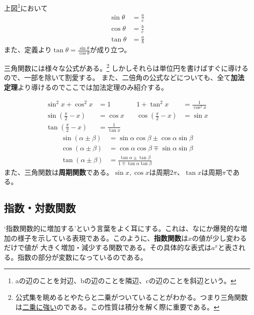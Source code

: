 \documentclass[a4j,dvipdfmx]{jsarticle}
\begin{document}
                上図\footnote{aの辺のことを対辺、bの辺のことを隣辺、cの辺のことを斜辺という。}において
                \begin{align}
                    \sin \theta &= \frac{a}{c}\\
                    \cos \theta &= \frac{b}{c}\\
                    \tan \theta &= \frac{a}{b}
                \end{align}
                また、定義より$\displaystyle\tan \theta = \frac{\sin \theta}{\cos \theta}$が成り立つ。

                三角関数には様々な公式がある。\footnote{公式集を眺めるとやたらと二乗がついていることがわかる。つまり三角関数は\underline{二乗に強い}のである。この性質は積分を解く際に重要である。}
                しかしそれらは単位円を書けばすぐに導けるので、一部を除いて割愛する。
                また、二倍角の公式などについても、全て\textbf{加法定理}より導けるのでここでは加法定理のみ紹介する。

                \begin{align}
                    \sin^2 x + \cos ^2 x &= 1 &\quad 1 + \tan^2 x &= \frac{1}{\cos^2 x}\\
                    \sin\left(\frac{\pi}{2}-x\right) &= \cos x &\quad \cos\left(\frac{\pi}{2}-x\right) &= \sin x\\
                    \tan\left(\frac{\pi}{2}-x\right) &= \frac{1}{\tan x} &&
                \end{align}
                \begin{align}
                    \sin(\alpha\pm\beta) &= \sin\alpha\cos\beta \pm \cos\alpha\sin\beta\\
                    \cos(\alpha\pm\beta) &= \cos\alpha\cos\beta \mp \sin\alpha\sin\beta\\
                    \tan(\alpha\pm\beta) &= \frac{\tan\alpha\pm\tan\beta}{1\mp\tan\alpha\tan\beta}
                \end{align}
                また、三角関数は\textbf{周期関数}である。$\sin x,\cos x$は周期$2\pi$、$\tan x$は周期$\pi$である。
            \clearpage
            \subsection{指数・対数関数}
                `指数関数的に増加する'という言葉をよく耳にする。これは、なにか爆発的な増加の様子を示している表現である。このように、\textbf{指数関数}は$x$の値が少し変わるだけで値が
                大きく増加・減少する関数である。その具体的な表式は$a^x$と表される。指数の部分が変数になっているのである。
\end{document}

